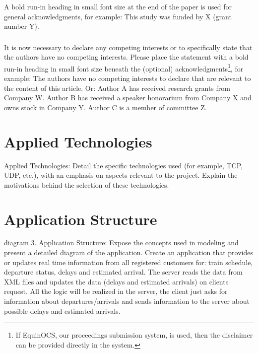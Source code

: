 \documentclass[runningheads]{llncs}
\begin{document}
\begin{credits}
\subsubsection{\ackname} A bold run-in heading in small font size at the end of the paper is
used for general acknowledgments, for example: This study was funded
by X (grant number Y).

\subsubsection{\discintname}
It is now necessary to declare any competing interests or to specifically
state that the authors have no competing interests. Please place the
statement with a bold run-in heading in small font size beneath the
(optional) acknowledgments\footnote{If EquinOCS, our proceedings submission
system, is used, then the disclaimer can be provided directly in the system.},
for example: The authors have no competing interests to declare that are
relevant to the content of this article. Or: Author A has received research
grants from Company W. Author B has received a speaker honorarium from
Company X and owns stock in Company Y. Author C is a member of committee Z.
\end{credits}

\section{Applied Technologies}

Applied Technologies: Detail the specific technologies used (for example, TCP, UDP, etc.), with an emphasis on aspects relevant to the project. Explain the motivations behind the selection of these technologies.


\section{Application Structure}

diagram
3. Application Structure: Expose the concepts used in modeling and present a detailed diagram of the application.
Create an application that provides or updates real time information from all registered customers for: train schedule, departure status, delays and estimated arrival. The server reads the data from XML files and updates the data (delays and estimated arrivals) on clients request. All the logic will be realized in the server, the client just asks for information about departures/arrivals and sends information to the server about possible delays and estimated arrivals.
\end{document}
